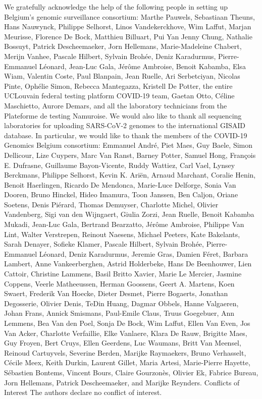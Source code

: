 We gratefully acknowledge the help of the following people in setting up Belgium’s genomic surveillance consortium: Marthe Pauwels, Sebastiaan Theuns, Hans Nauwynck, Philippe Selhorst, Linos Vandekerckhove, Wim Laffut, Marjan Meurisse, Florence De Bock, Matthieu Billuart, Pui Yan Jenny Chung, Nathalie Bossuyt, Patrick Descheemaeker, Jorn Hellemans, Marie-Madeleine Chabert, Merijn Vanhee, Pascale Hilbert, Sylvain Brohée, Deniz Karadurmus, Pierre-Emmanuel Léonard, Jean-Luc Gala, Jérôme Ambroise, Benoit Kabamba, Elsa Wiam, Valentin Coste, Paul Blanpain, Jean Ruelle, Ari Serbetciyan, Nicolas Pinte, Ophélie Simon, Rebecca Mantegazza, Kristell De Potter, the entire UCLouvain federal testing platform COVID-19 team, Gaetan Otto, Céline Maschietto, Aurore Demars, and all the laboratory technicians from the Plateforme de testing Namuroise. We would also like to thank all sequencing laboratories for uploading SARS-CoV-2 genomes to the international GISAID database. In particular, we would like to thank the members of the COVID-19 Genomics Belgium consortium: Emmanuel André, Piet Maes, Guy Baele, Simon Dellicour, Lize Cuypers, Marc Van Ranst, Barney Potter, Samuel Hong, François E. Dufrasne, Guillaume Bayon-Vicente, Ruddy Wattiez, Carl Vael, Lynsey Berckmans, Philippe Selhorst, Kevin K. Ariën, Arnaud Marchant, Coralie Henin, Benoit Haerlingen, Ricardo De Mendonca, Marie-Luce Delforge, Sonia Van Dooren, Bruno Hinckel, Hideo Imamura, Toon Janssen, Ben Caljon, Oriane Soetens, Denis Piérard, Thomas Demuyser, Charlotte Michel, Olivier Vandenberg, Sigi van den Wijngaert, Giulia Zorzi, Jean Ruelle, Benoit Kabamba Mukadi, Jean-Luc Gala, Bertrand Bearzatto, Jérôme Ambroise, Philippe Van Lint, Walter Verstrepen, Reinout Naesens, Michael Peeters, Kate Bakelants, Sarah Denayer, Sofieke Klamer, Pascale Hilbert, Sylvain Brohée, Pierre-Emmanuel Léonard, Deniz Karadurmus, Jeremie Gras, Damien Féret, Barbara Lambert, Anne Vankeerberghen, Astrid Holderbeke, Hans De Beenhouwer, Lien Cattoir, Christine Lammens, Basil Britto Xavier, Marie Le Mercier, Jasmine Coppens, Veerle Matheeussen, Herman Goossens, Geert A. Martens, Koen Swaert, Frederik Van Hoecke, Dieter Desmet, Pierre Bogaerts, Jonathan Degosserie, Olivier Denis, TeDin Huang, Dagmar Obbels, Hanne Valgaeren, Johan Frans, Annick Smismans, Paul-Emile Claus, Truus Goegebuer, Ann Lemmens, Bea Van den Poel, Sonja De Bock, Wim Laffut, Ellen Van Even, Jos Van Acker, Charlotte Verfaillie, Elke Vanlaere, Klara De Rauw, Brigitte Maes, Guy Froyen, Bert Cruys, Ellen Geerdens, Luc Waumans, Britt Van Meensel, Reinoud Cartuyvels, Severine Berden, Marijke Raymaekers, Bruno Verhasselt, Cécile Meex, Keith Durkin, Laurent Gillet, Maria Artesi, Marie-Pierre Hayette, Sébastien Bontems, Vincent Bours, Claire Gourzonès, Olivier Ek, Fabrice Bureau, Jorn Hellemans, Patrick Descheemaeker, and Marijke Reynders.
Conflicts of Interest
The authors declare no conflict of interest.


\cleardoublepage

